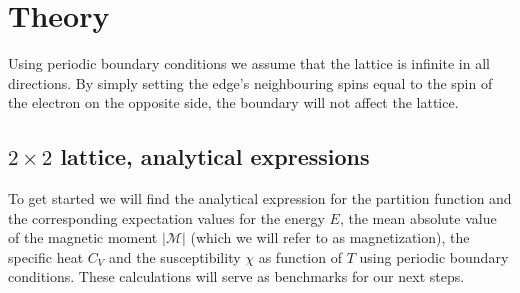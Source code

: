 \documentclass[../main.tex]{subfiles}
\begin{document}
\section{Theory}
Using periodic boundary conditions we assume that the lattice is infinite in all directions. By simply setting the edge's neighbouring spins equal to the spin of the electron on the opposite side, the boundary will not affect the lattice.

\subsection{$2 \times 2$ lattice, analytical expressions} \label{sec:theory-analy}
To get started we will find the analytical expression for the partition function and the corresponding expectation values for the energy $E$, the mean absolute value of the magnetic moment $|\mathcal M|$ (which we will refer to as magnetization), the specific heat $C_V$ and the susceptibility $\chi$ as function of $T$ using periodic boundary conditions. These calculations will serve as benchmarks for our next steps.

\end{document}
